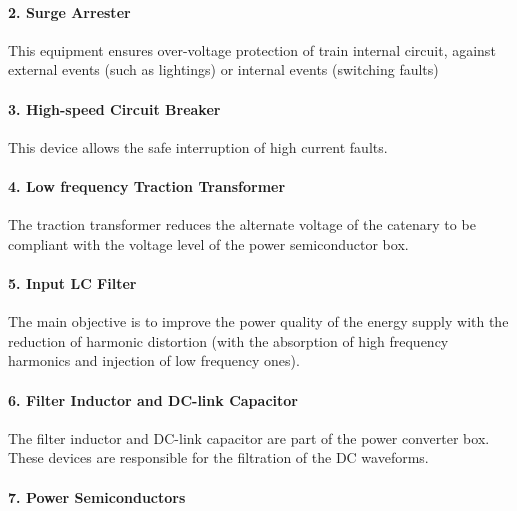 \paragraph{2. Surge Arrester\\}

	This equipment ensures over-voltage protection of train internal circuit, against external events (such as lightings) or internal events (switching faults)
	
\paragraph{3. High-speed Circuit Breaker\\}
	
	This device allows the safe interruption of high current faults.
	
\paragraph{4. Low frequency Traction Transformer\\}
	
	The traction transformer reduces the alternate voltage of the catenary to be compliant with the voltage level of the power semiconductor box.
	
\paragraph{5. Input LC Filter\\}

	The main objective is to improve the power quality of the energy supply with the reduction of harmonic distortion (with the absorption of high frequency harmonics and injection of low frequency ones).

\paragraph{6. Filter Inductor and DC-link Capacitor\\}

	The filter inductor and DC-link capacitor are part of the power converter box. These devices are responsible for the filtration of the DC waveforms.
	
\paragraph{7. Power Semiconductors\\}

